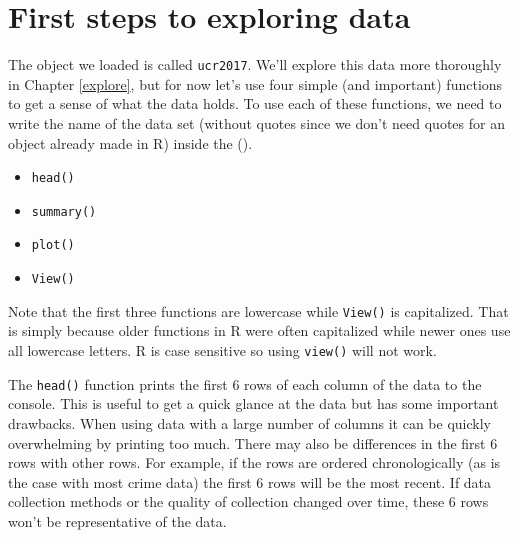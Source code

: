 \documentclass[
]{krantz}
\providecommand{\tightlist}{%
  \setlength{\itemsep}{0pt}\setlength{\parskip}{0pt}}
\begin{document}
\hypertarget{first-steps-to-exploring-data}{%
\section{First steps to exploring
data}\label{first-steps-to-exploring-data}}

The object we loaded is called \texttt{ucr2017}. We'll
explore this data more thoroughly in Chapter \ref{explore},
but for now let's use four simple (and important) functions
to get a sense of what the data holds. To use each of these
functions, we need to write the name of the data set
(without quotes since we don't need quotes for an object
already made in R) inside the ().

\begin{itemize}
\tightlist
\item
  \texttt{head()}
\item
  \texttt{summary()}
\item
  \texttt{plot()}
\item
  \texttt{View()}
\end{itemize}

Note that the first three functions are lowercase while
\texttt{View()} is capitalized. That is simply because older
functions in R were often capitalized while newer ones use
all lowercase letters. R is case sensitive so using
\texttt{view()} will not work.

The \texttt{head()} function prints the first 6 rows of each
column of the data to the console. This is useful to get a
quick glance at the data but has some important drawbacks.
When using data with a large number of columns it can be
quickly overwhelming by printing too much. There may also be
differences in the first 6 rows with other rows. For
example, if the rows are ordered chronologically (as is the
case with most crime data) the first 6 rows will be the most
recent. If data collection methods or the quality of
collection changed over time, these 6 rows won't be
representative of the data.
\end{document}

